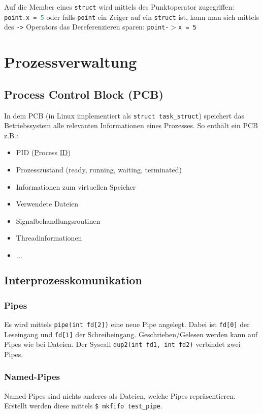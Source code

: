 \documentclass[11pt]{scrartcl}
\begin{document}
Auf die Member eines \texttt{struct} wird mittels des Punktoperator zugegriffen: \lstinline[language=C]{point.x = 5} oder falls \texttt{point} ein Zeiger auf ein \texttt{struct} ist, kann man sich mittels des \lstinline!->! Operators das Dereferenzieren sparen: \texttt{point-$>$x = 5}

\section{Prozessverwaltung}

\subsection{Process Control Block (PCB)}
In dem PCB (in Linux implementiert als \texttt{struct task\_struct}) speichert das Betriebssystem alle relevanten Informationen eines Prozesses. So enthält ein PCB z.B.:

\begin{itemize}
\item{PID (\underline Process \underline{ID}})
\item{Prozesszustand (ready, running, waiting, terminated)}
\item{Informationen zum virtuellen Speicher}
\item{Verwendete Dateien}
\item{Signalbehandlungsroutinen}
\item{Threadinformationen}
\item{$\ldots$}
\end{itemize}

\subsection{Interprozesskomunikation}
\subsubsection{Pipes}
Es wird mittels \texttt{pipe(int fd{[}2{]})} eine neue Pipe angelegt. Dabei ist \texttt{fd{[}0{]}} der Leseingang und \texttt{fd{[}1{]}} der Schreibeingang. Geschrieben/Gelesen werden kann auf Pipes wie bei Dateien. Der Syscall \texttt{dup2(int fd1, int fd2)} verbindet zwei Pipes.

\subsubsection{Named-Pipes}
Named-Pipes sind nichts anderes als Dateien, welche Pipes repräsentieren. Erstellt werden diese mittels \lstinline[language=Bash]!$ mkfifo test_pipe!.
\end{document}
